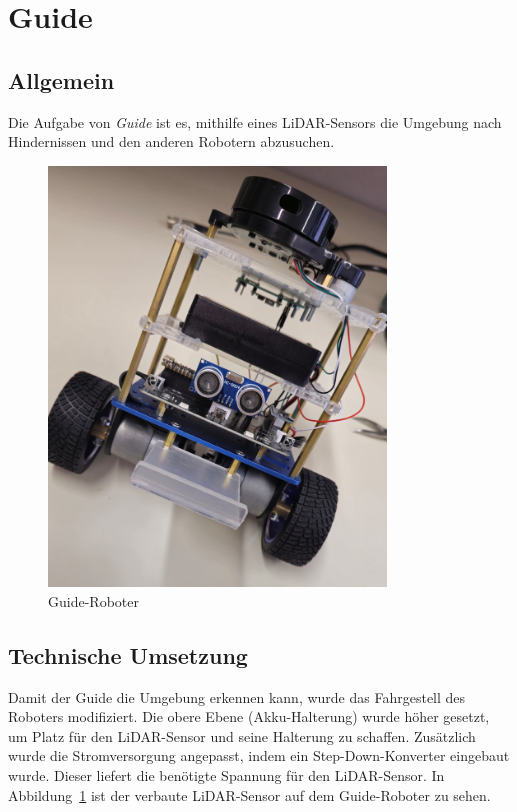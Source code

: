 


\section{Guide}
\label{subsec:hardware_guide}
\subsection{Allgemein}
Die Aufgabe von \textit{Guide} ist es,
mithilfe eines LiDAR-Sensors die Umgebung nach Hindernissen und den anderen Robotern abzusuchen.

\begin{figure}[H]
   \centering
   \includegraphics[width=0.8\textwidth]{img/Hardware/guide.jpg}
   \caption{Guide-Roboter}
    \label{fig:guide}
\end{figure}

\subsection{Technische Umsetzung}
Damit der Guide die Umgebung erkennen kann, wurde das Fahrgestell des Roboters modifiziert.
%
Die obere Ebene (Akku-Halterung) wurde höher gesetzt, um Platz für den LiDAR-Sensor und seine Halterung zu schaffen.
%
Zusätzlich wurde die Stromversorgung angepasst, indem ein Step-Down-Konverter eingebaut wurde.
%
Dieser liefert die benötigte Spannung für den LiDAR-Sensor.
%
In Abbildung~\ref{fig:guide} ist der verbaute LiDAR-Sensor auf dem Guide-Roboter zu sehen.

